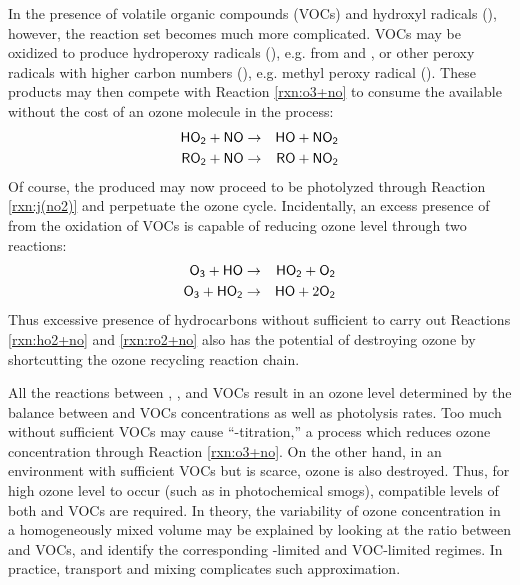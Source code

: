 In the presence of volatile organic compounds (VOCs) and hydroxyl radicals (), however, the reaction set becomes much more complicated. VOCs may be oxidized to produce hydroperoxy radicals (), e.g. from  and , or other peroxy radicals with higher carbon numbers (), e.g. methyl peroxy radical (). These products may then compete with Reaction \ref{rxn:o3+no} to consume the available  without the cost of an ozone molecule in the process:
\begin{eqnarray}
	\chem{HO_2} + \chem{NO} &\rightarrow& \chem{HO} + \chem{NO_2} \label{rxn:ho2+no} \\
	\chem{RO_2} + \chem{NO} &\rightarrow& \chem{RO} + \chem{NO_2} \label{rxn:ro2+no}
\end{eqnarray}
Of course, the produced  may now proceed to be photolyzed through Reaction \ref{rxn:j(no2)} and perpetuate the ozone cycle. Incidentally, an excess presence of  from the oxidation of VOCs is capable of reducing ozone level through two reactions:
\begin{eqnarray}
	\chem{O_3} + \chem{HO} &\rightarrow& \chem{HO_2} + \chem{O_2} \label{rxn:o3+ho} \\
	\chem{O_3} + \chem{HO_2} &\rightarrow& \chem{HO} + 2\chem{O_2} \label{rxn:o3+ho2}
\end{eqnarray}
Thus excessive presence of hydrocarbons without sufficient  to carry out Reactions \ref{rxn:ho2+no} and \ref{rxn:ro2+no} also has the potential of destroying ozone by shortcutting the ozone recycling reaction chain.

All the reactions between , ,  and VOCs result in an ozone level determined by the balance between  and VOCs concentrations as well as photolysis rates. Too much  without sufficient VOCs may cause ``-titration,'' a process which reduces ozone concentration through Reaction \ref{rxn:o3+no}. On the other hand, in an environment with sufficient VOCs but  is scarce, ozone is also destroyed. Thus, for high ozone level to occur (such as in photochemical smogs), compatible levels of both  and VOCs are required. In theory, the variability of ozone concentration in a homogeneously mixed volume may be explained by looking at the ratio between  and VOCs, and identify the corresponding -limited and VOC-limited regimes. In practice, transport and mixing complicates such approximation.


